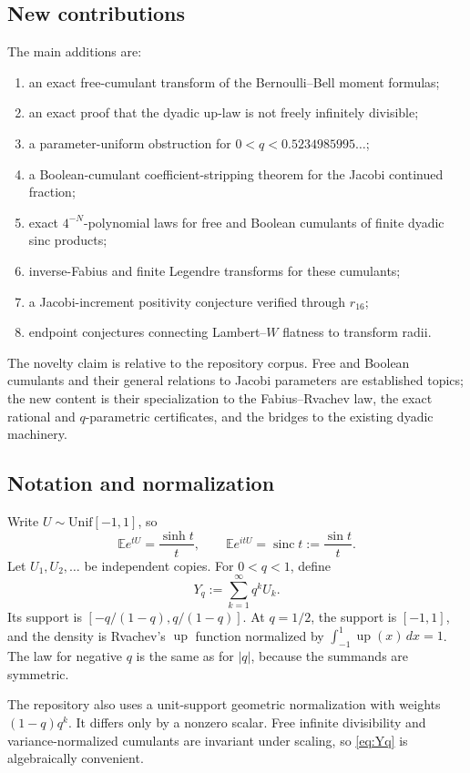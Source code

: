 \documentclass[11pt]{article}
\theoremstyle{definition}
\newcommand{\Up}{\operatorname{up}}
\newcommand{\sinc}{\operatorname{sinc}}
\newcommand{\E}{\mathbb{E}}
\begin{document}
\subsection{New contributions}
The main additions are:
\begin{enumerate}[label=\textbf{N\arabic*.},leftmargin=3.2em]
\item an exact free-cumulant transform of the Bernoulli--Bell moment formulas;
\item an exact proof that the dyadic up-law is not freely infinitely divisible;
\item a parameter-uniform obstruction for \(0<q<0.5234985995\ldots\);
\item a Boolean-cumulant coefficient-stripping theorem for the Jacobi continued fraction;
\item exact \(4^{-N}\)-polynomial laws for free and Boolean cumulants of finite dyadic sinc products;
\item inverse-Fabius and finite Legendre transforms for these cumulants;
\item a Jacobi-increment positivity conjecture verified through \(r_{16}\);
\item endpoint conjectures connecting Lambert--\(W\) flatness to transform radii.
\end{enumerate}
The novelty claim is relative to the repository corpus. Free and Boolean cumulants and their general relations to Jacobi parameters are established topics; the new content is their specialization to the Fabius--Rvachev law, the exact rational and \(q\)-parametric certificates, and the bridges to the existing dyadic machinery.

\subsection{Notation and normalization}
Write \(U\sim\mathrm{Unif}[-1,1]\), so
\[
\E e^{tU}=\frac{\sinh t}{t},\qquad \E e^{itU}=\sinc t:=\frac{\sin t}{t}.
\]
Let \(U_1,U_2,\ldots\) be independent copies. For \(0<q<1\), define
\begin{equation}\label{eq:Yq}
Y_q:=\sum_{k=1}^{\infty}q^kU_k.
\end{equation}
Its support is \([-q/(1-q),q/(1-q)]\). At \(q=1/2\), the support is \([-1,1]\), and the density is Rvachev's \(\Up\) function normalized by \(\int_{-1}^1\Up(x)\,dx=1\). The law for negative \(q\) is the same as for \(|q|\), because the summands are symmetric.

The repository also uses a unit-support geometric normalization with weights \((1-q)q^k\). It differs only by a nonzero scalar. Free infinite divisibility and variance-normalized cumulants are invariant under scaling, so \eqref{eq:Yq} is algebraically convenient.
\end{document}

